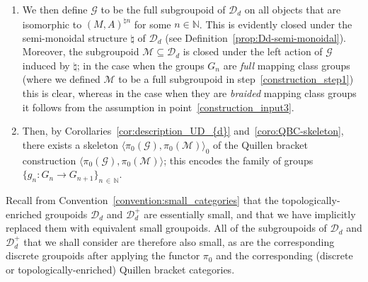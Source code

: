 \documentclass[AHL,Unicode,published]{cedram}
\newcommand{\cD}{\mathcal{D}}
\newcommand{\cG}{\mathcal{G}}
\newcommand{\cM}{\mathcal{M}}
\newcommand{\bN}{\mathbb{N}}
\begin{document}
\begin{enonce}
\begin{enumerate}
We first define $\cM$ to be a certain subgroupoid of $\cD_{d}$ whose objects are all decorated manifolds that are isomorphic to $(M_{n},A_{n})$ for some $n \in \bN$. In the case when $G_n$ is a \emph{full} mapping class group, we define $\cM$ to be the full subgroupoid on these objects. In the case when $G_n$ is a \emph{braided} mapping class group, we must be slightly more careful. For each decorated manifold $(N,\emptyset)$ in the isomorphism class of $(M_{n},\emptyset)$, let us fix an isomorphism $i_{(N,\emptyset)} \colon (N,\emptyset) \cong (M_{n},\emptyset)$; in the case $(N,\emptyset) = (M_{n},\emptyset)$ we take it to be the identity. We then define the morphisms of $\cM$ to be those isomorphisms $(N,B) \cong (N',B')$ that become isotopic to $i_{(N',\emptyset)}^{-1} \circ i_{(N,\emptyset)}$ after forgetting the submanifolds $B$ and $B'$. (We call these \emph{braided isomorphisms}, generalising Definition~\ref{def:braided-diffeomorphisms} to isomorphisms between distinct objects.) This ensures that $\cM$ is a well-defined subgroupoid of $\cD_d$ and that its automorphism groups are braided diffeomorphism groups.
\item\label{construction_step2}
We then define $\cG$ to be the full subgroupoid of $\cD_{d}$ on all objects that are isomorphic to $(M,A)^{\natural n}$ for some $n\in\bN$. This is evidently closed under the semi-monoidal structure $\natural$ of $\cD_{d}$ (see Definition~\ref{prop:Dd-semi-monoidal}). Moreover, the subgroupoid $\cM \subseteq \cD_d$ is closed under the left action of $\cG$ induced by $\natural$; in the case when the groups $G_n$ are \emph{full} mapping class groups (where we defined $\cM$ to be a full subgroupoid in step~\ref{construction_step1}) this is clear, whereas in the case when they are \emph{braided} mapping class groups it follows from the assumption in point~\eqref{construction_input3}.
\item\label{construction_step3}
Then, by Corollaries~\ref{cor:description_UD_{d}} and~\ref{coro:QBC-skeleton}, there exists a skeleton $\langle \pi_{0}(\cG), \pi_{0}(\cM)\rangle_{0}$ of the Quillen bracket construction $\langle \pi_{0}(\cG), \pi_{0}(\cM)\rangle$; this encodes the family of groups $\{g_{n}\colon G_{n}\to G_{n+1}\}_{n\,\in\,\bN}$.
\end{enumerate}
\end{enonce}

\begin{rema}\label{rmk:small_categories_pi_{0}}
Recall from Convention~\ref{convention:small_categories} that the topologically-enriched grou\-poids $\cD_{d}$ and $\cD_{d}^{+}$ are essentially small, and that we have implicitly replaced them with equivalent small groupoids. All of the subgroupoids of $\cD_{d}$ and $\cD_d^{+}$ that we shall consider are therefore also small, as are the corresponding discrete groupoids after applying the functor $\pi_{0}$ and the corresponding (discrete or topologically-enriched) Quillen bracket categories.
\end{rema}
\end{document}
